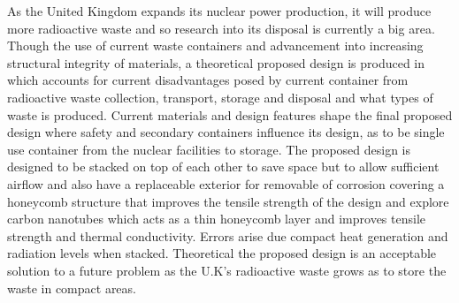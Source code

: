 As the United Kingdom expands its nuclear power production, it will produce more radioactive waste and so research into its disposal is currently a big area. Though the use of current waste containers and advancement into increasing structural integrity of materials, a theoretical proposed design is produced in which accounts for current disadvantages posed by current container from radioactive waste collection, transport, storage and disposal and what types of waste is produced. Current materials and design features shape the final proposed design where safety and secondary containers influence its design, as to be single use container from the nuclear facilities to storage. The proposed design is designed to be stacked on top of each other to save space but to allow sufficient airflow and also have a replaceable exterior for removable of corrosion covering a honeycomb structure that improves the tensile strength of the design and explore carbon nanotubes which acts as a thin honeycomb layer and improves tensile strength and thermal conductivity. Errors arise due compact heat generation and radiation levels when stacked. Theoretical the proposed design is an acceptable solution to a future problem as the U.K’s radioactive waste grows as to store the waste in compact areas.